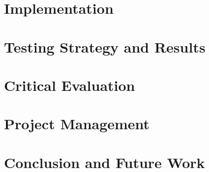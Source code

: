 \documentclass[12pt,a4paper]{report}
\begin{document}
	\chapter{Implementation}
	
	
	\chapter{Testing Strategy and Results}
	
	
	\chapter{Critical Evaluation}
	
	
	\chapter{Project Management}
	
	
	\chapter{Conclusion and Future Work}
	
	
	
	
	
	{}
	
\end{document}

